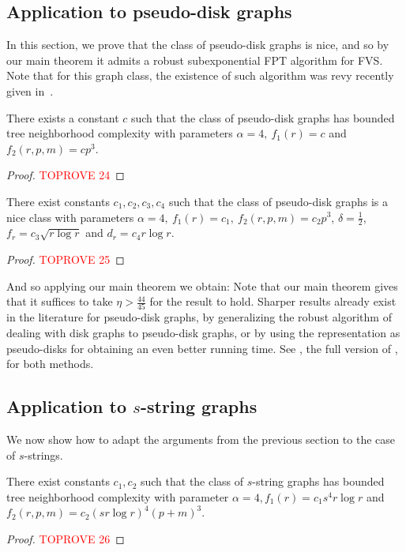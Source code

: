 \documentclass{amsart}
\newcommand{\f}{f}
\newcommand{\FVS}{\textsc{FVS}\xspace}
\begin{document}
 


\subsection{Application to pseudo-disk graphs}
In this section, we prove that the class of pseudo-disk graphs is nice, and so by our main theorem it admits a robust subexponential FPT algorithm for \FVS. Note that for this graph class, the existence of such algorithm was revy recently given in~\cite{FVS-WG}.
\begin{lemma}\label{lm:pseudotreeneigh}
    There exists a constant $c$ such that the class of pseudo-disk graphs has bounded tree neighborhood complexity with parameters $\alpha=4,~f_1(r)=c$ and $f_2(r,p,m)=cp^3$.
\end{lemma}
\begin{proof}\textcolor{red}{TOPROVE 24}\end{proof}

\begin{lemma}
    There exist constants $c_1,c_2,c_3,c_4$ such that the class of pseudo-disk graphs is a nice class with parameters $\alpha=4,~f_1(r)=c_1,~f_2(r,p,m)=c_2p^3$, $\delta=\frac 12$, $f_r=c_3\sqrt{r\log r}$ and $d_r=c_4r\log r$.
\end{lemma}
\begin{proof}\textcolor{red}{TOPROVE 25}\end{proof}
And so applying our main theorem we obtain:
\maincortwo*
Note that our main theorem gives that it suffices to take $\eta>\frac{44}{45}$ for the result to hold. Sharper results already exist in the literature for pseudo-disk graphs, by generalizing the robust algorithm of \cite{lokSODA22} dealing with disk graphs to pseudo-disk graphs, or by using the representation as pseudo-disks for obtaining an even better running time. See \cite{preprintFVSpseudo}, the full version of \cite{FVS-WG}, for both methods.
\subsection{Application to \texorpdfstring{$s$}{s}-string graphs}\label{ssec:sstring}
We now show how to adapt the arguments from the previous section to the case of $s$-strings.

\begin{lemma}\label{lm:sstringtreeneigh}
 There exist constants $c_1,c_2$ such that the class of $s$-string graphs has bounded tree neighborhood complexity with parameter $\alpha=4, \f_1(r)=c_1s^4r\log r$ and $f_2(r,p,m)=c_2(sr\log r)^4(p+m)^3$.
\end{lemma}
\begin{proof}\textcolor{red}{TOPROVE 26}\end{proof}
\end{document}
